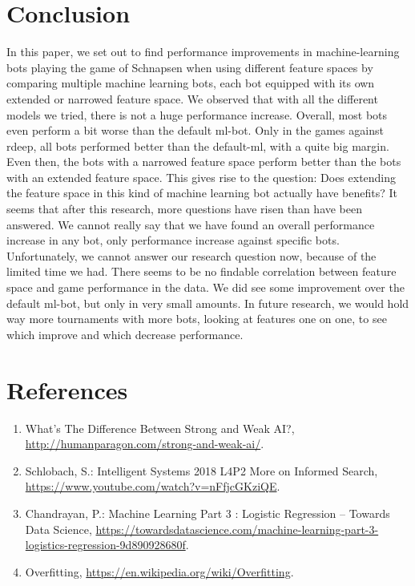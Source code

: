 \documentclass[a4paper,11pt]{article}
\begin{document}
\section{Conclusion}
In this paper, we set out to find performance improvements in machine-learning bots  playing the game of Schnapsen when using different feature spaces by comparing multiple machine learning bots, each bot equipped with its own extended or narrowed feature space. We observed that with all the different models we tried, there is not a huge performance increase. Overall, most bots even perform a bit worse than the default ml-bot. Only in the games against rdeep, all bots performed better than the default-ml, with a quite big margin. Even then, the bots with a narrowed feature space perform better than the bots with an extended feature space. This gives rise to the question: Does extending the feature space in this kind of machine learning bot actually have benefits? It seems that after this research, more questions have risen than have been answered. We cannot really say that we have found an overall performance increase in any bot, only performance increase against specific bots. Unfortunately, we cannot answer our research question now, because of the limited time we had. There seems to be no findable correlation between feature space and game performance in the data. We did see some improvement over the default ml-bot, but only in very small amounts. In future research, we would hold way more tournaments with more bots, looking at features one on one, to see which improve and which decrease performance.


\section{References}

\begin{enumerate}
\item What's The Difference Between Strong and Weak AI?, \url{http://humanparagon.com/strong-and-weak-ai/}.

\item Schlobach, S.: Intelligent Systems 2018 L4P2 More on Informed Search, \url{https://www.youtube.com/watch?v=nFfjcGKziQE}.

\item Chandrayan, P.: Machine Learning Part 3 : Logistic Regression – Towards Data Science, \url{https://towardsdatascience.com/machine-learning-part-3-logistics-regression-9d890928680f}.

\item Overfitting, \url{https://en.wikipedia.org/wiki/Overfitting}.\\

\end{enumerate}
\end{document}
